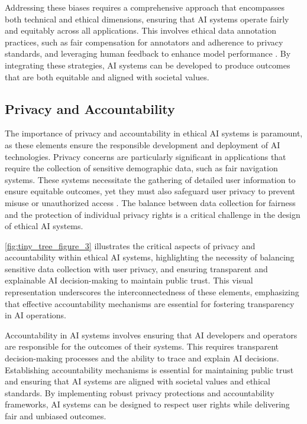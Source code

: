 Addressing these biases requires a comprehensive approach that encompasses both technical and ethical dimensions, ensuring that AI systems operate fairly and equitably across all applications. This involves ethical data annotation practices, such as fair compensation for annotators and adherence to privacy standards, and leveraging human feedback to enhance model performance \cite{park2023domainadaptationbasedhuman}. By integrating these strategies, AI systems can be developed to produce outcomes that are both equitable and aligned with societal values.




\subsection{Privacy and Accountability} \label{subsec:Privacy and Accountability}

The importance of privacy and accountability in ethical AI systems is paramount, as these elements ensure the responsible development and deployment of AI technologies. Privacy concerns are particularly significant in applications that require the collection of sensitive demographic data, such as fair navigation systems. These systems necessitate the gathering of detailed user information to ensure equitable outcomes, yet they must also safeguard user privacy to prevent misuse or unauthorized access \cite{brandao2020fairnavigationplanninghumanitarian}. The balance between data collection for fairness and the protection of individual privacy rights is a critical challenge in the design of ethical AI systems. 

\autoref{fig:tiny_tree_figure_3} illustrates the critical aspects of privacy and accountability within ethical AI systems, highlighting the necessity of balancing sensitive data collection with user privacy, and ensuring transparent and explainable AI decision-making to maintain public trust. This visual representation underscores the interconnectedness of these elements, emphasizing that effective accountability mechanisms are essential for fostering transparency in AI operations.

Accountability in AI systems involves ensuring that AI developers and operators are responsible for the outcomes of their systems. This requires transparent decision-making processes and the ability to trace and explain AI decisions. Establishing accountability mechanisms is essential for maintaining public trust and ensuring that AI systems are aligned with societal values and ethical standards. By implementing robust privacy protections and accountability frameworks, AI systems can be designed to respect user rights while delivering fair and unbiased outcomes.


